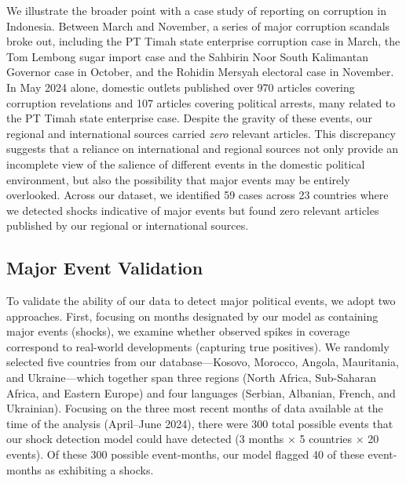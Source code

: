 \documentclass[
  letterpaper,
  DIV=11,
  numbers=noendperiod]{scrartcl}
\begin{document}
We illustrate the broader point with a case study of reporting on
corruption in Indonesia. Between March and November, a series of major
corruption scandals broke out, including the PT Timah state enterprise
corruption case in March, the Tom Lembong sugar import case and the
Sahbirin Noor South Kalimantan Governor case in October, and the Rohidin
Mersyah electoral case in November. In May 2024 alone, domestic outlets
published over 970 articles covering corruption revelations and 107
articles covering political arrests, many related to the PT Timah state
enterprise case. Despite the gravity of these events, our regional and
international sources carried \emph{zero} relevant articles. This
discrepancy suggests that a reliance on international and regional
sources not only provide an incomplete view of the salience of different
events in the domestic political environment, but also the possibility
that major events may be entirely overlooked. Across our dataset, we
identified 59 cases across 23 countries where we detected shocks
indicative of major events but found zero relevant articles published by
our regional or international sources.

\hypertarget{major-event-validation}{%
\subsection{Major Event Validation}\label{major-event-validation}}

To validate the ability of our data to detect major political events, we
adopt two approaches. First, focusing on months designated by our model
as containing major events (shocks), we examine whether observed spikes
in coverage correspond to real-world developments (capturing true
positives). We randomly selected five countries from our
database---Kosovo, Morocco, Angola, Mauritania, and Ukraine---which
together span three regions (North Africa, Sub-Saharan Africa, and
Eastern Europe) and four languages (Serbian, Albanian, French, and
Ukrainian). Focusing on the three most recent months of data available
at the time of the analysis (April--June 2024), there were 300 total
possible events that our shock detection model could have detected (3
months × 5 countries × 20 events). Of these 300 possible event-months,
our model flagged 40 of these event-months as exhibiting a shocks.
\end{document}
